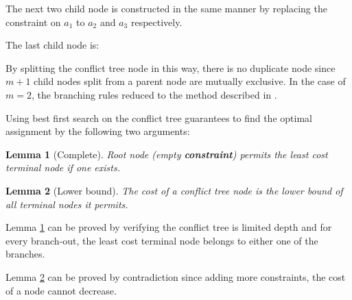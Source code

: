 \documentclass{article}
\newtheorem{lemma}{Lemma}
\begin{document}
    The next two child node is constructed in the same manner by replacing the constraint on $a_1$ to $a_2$ and $a_3$ respectively.
    
    The last child node is:
    
    
    By splitting the conflict tree node in this way, there is no duplicate node since $m+1$ child nodes split from a parent node are mutually exclusive. In the case of $m=2$, the branching rules reduced to the method described in \cite{sharon2015conflict}.
    
    Using best first search on the conflict tree guarantees to find the optimal assignment by the following two arguments:
    
    \begin{lemma}[Complete]
    Root node (empty \textbf{constraint}) permits the least cost terminal node if one exists.
    \label{lemma:complete}
    \end{lemma}
    
    \begin{lemma}[Lower bound]
    The cost of a conflict tree node is the lower bound of all terminal nodes it permits.
    \label{lemma:lowerbound}
    \end{lemma}
    
    Lemma \ref{lemma:complete} can be proved by verifying the conflict tree is limited depth and for every branch-out, the least cost terminal node belongs to either one of the branches.
    
    Lemma \ref{lemma:lowerbound} can be proved by contradiction since adding more constraints, the cost of a node cannot decrease.


    
\end{document}
